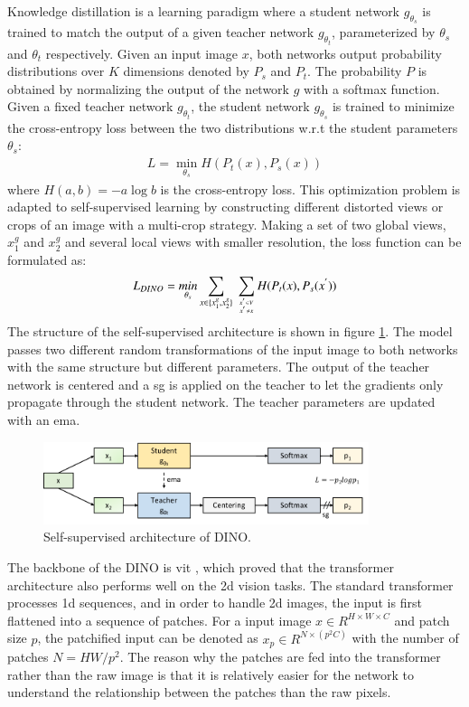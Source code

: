 \documentclass[12pt,DIV14,BCOR12mm,a4paper,footinclude=false,headinclude,parskip=half-,twoside,openright,cleardoublepage=empty,toc=index,bibliography=totoc,listof=totoc]{scrreprt}
\numberwithin{equation}{chapter}
\begin{document}
Knowledge distillation is a learning paradigm where a student network $g_{\theta_{s}}$ is trained to match the output of a given teacher network $g_{\theta_{t}}$, parameterized by $\theta_{s}$ and $\theta_{t}$ respectively. Given an input image $x$, both networks output probability distributions over $K$ dimensions denoted by $P_{s}$ and $P_{t}$. The probability $P$ is obtained by normalizing the output of the network $g$ with a softmax function. Given a fixed teacher network $g_{\theta_{t}}$, the student network $g_{\theta_{s}}$ is trained to minimize the cross-entropy loss between the two distributions w.r.t the student parameters $\theta_{s}$:
\begin{align}
  L = \mathop{min}_{\theta_{s}}H(P_{t}(x), P_{s}(x))
\end{align}
where $H(a,b)=-a \log b$ is the cross-entropy loss. This optimization problem is adapted to self-supervised learning by constructing different distorted views or crops of an image with a multi-crop strategy. Making a set of two global views, $x_{1}^{g}$ and $x_{2}^{g}$ and several local views with smaller resolution, the loss function can be formulated as:
\begin{align}
  L_{DINO}=\mathop{min}_{\theta_{s}}\mathop{\sum}_{x\in \{x_{1}^{g},x_{2}^{g}\}} \ \mathop{\sum}_{x^{'}\in V \atop x^{'}\neq x}H(P_{t}(x), P_{s}(x^{'}))
\end{align}
The structure of the self-supervised architecture is shown in figure \ref{img:dino}. The model passes two different random transformations of the input image to both networks with the same structure but different parameters. The output of the teacher network is centered and a \gls{sg} is applied on the teacher to let the gradients only propagate through the student network. The teacher parameters are updated with an \gls{ema}.
\begin{figure}[h]
	\centering
	\includegraphics[width=0.85\textwidth]{img/dino.pdf}
	\caption{Self-supervised architecture of DINO.}
	\label{img:dino}
\end{figure}

The backbone of the DINO is \gls{vit} \cite{dosovitskiy2021image}, which proved that the transformer architecture also performs well on the \gls{2d} vision tasks. The standard transformer processes \gls{1d} sequences, and in order to handle \gls{2d} images, the input is first flattened into a sequence of patches. For a input image $x\in R^{H\times W\times C}$ and patch size $p$, the patchified input can be denoted as $x_p\in R^{N\times(p^{2}C)}$ with the number of patches $N=HW/{p^{2}}$. The reason why the patches are fed into the transformer rather than the raw image is that it is relatively easier for the network to understand the relationship between the patches than the raw pixels.
\end{document}
